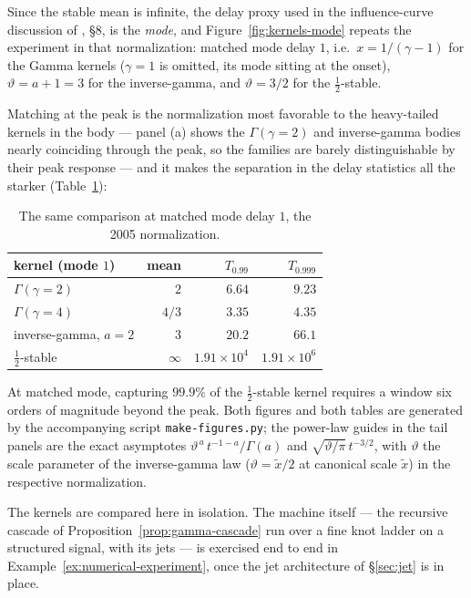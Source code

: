 \begin{example}
Since the stable mean is infinite, the delay proxy used in the influence-curve discussion of
, \S8, is the \emph{mode}, and Figure~\ref{fig:kernels-mode}
repeats the experiment in that normalization: matched mode delay $1$, i.e.\
$x = 1/(\gamma - 1)$ for the Gamma kernels ($\gamma = 1$ is omitted, its mode sitting at the
onset), $\vartheta = a + 1 = 3$ for the inverse-gamma, and $\vartheta = 3/2$ for the
$\tfrac12$-stable.


Matching at the peak is the normalization most favorable to the heavy-tailed kernels in the
body --- panel (a) shows the $\Gamma(\gamma{=}2)$ and inverse-gamma bodies nearly coinciding
through the peak, so the families are barely distinguishable by their peak response --- and it
makes the separation in the delay statistics all the starker
(Table~\ref{tab:windows-mode}):

\begin{table}[t]
\centering
\caption{The same comparison at matched mode delay $1$, the 2005 normalization.}
\label{tab:windows-mode}
\begin{tabular}{@{}lrrr@{}}
\toprule
kernel (mode $1$) & mean & $T_{0.99}$ & $T_{0.999}$ \\
\midrule
$\Gamma(\gamma{=}2)$ & $2$ & $6.64$ & $9.23$ \\
$\Gamma(\gamma{=}4)$ & $4/3$ & $3.35$ & $4.35$ \\
inverse-gamma, $a = 2$ & $3$ & $20.2$ & $66.1$ \\
$\tfrac12$-stable & $\infty$ & $1.91 \times 10^{4}$ & $1.91 \times 10^{6}$ \\
\bottomrule
\end{tabular}
\end{table}

At matched mode, capturing $99.9\%$ of the $\tfrac12$-stable kernel requires a window six
orders of magnitude beyond the peak. Both figures and both tables are generated by the
accompanying script \texttt{make-figures.py}; the power-law guides in the tail panels are the
exact asymptotes $\vartheta^{\,a}\, t^{-1-a}/\Gamma(a)$ and $\sqrt{\vartheta/\pi}\, t^{-3/2}$,
with $\vartheta$ the scale parameter of the inverse-gamma law ($\vartheta = \tilde x/2$ at canonical scale $\tilde x$) in the respective
normalization.

The kernels are compared here in isolation. The machine itself --- the recursive cascade
of Proposition~\ref{prop:gamma-cascade} run over a fine knot ladder on a structured
signal, with its jets --- is exercised end to end in
Example~\ref{ex:numerical-experiment}, once the jet architecture of \S\ref{sec:jet} is in
place.
\end{example}
